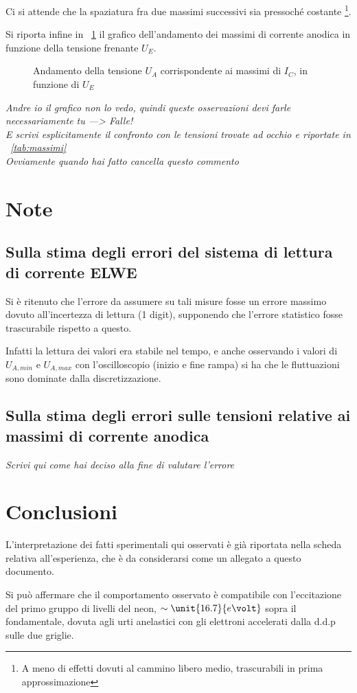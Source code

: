 \documentclass[10pt,a4paper]{article}
\begin{document}
Ci si attende che la spaziatura fra due massimi successivi sia pressoché costante \footnote{A meno di effetti dovuti al cammino libero medio, trascurabili in prima approssimazione}.


Si riporta infine in \figurename{~\ref{fig:final}} il grafico dell'andamento dei massimi di corrente anodica in funzione della tensione frenante $U_E$.

\begin{figure}[h!]
	\centering
	\caption{Andamento della tensione $U_A$ corrispondente ai massimi di $I_C$, in funzione di $U_E$}
	\label{fig:final}
\end{figure}

\emph{\LARGE Andre io il grafico non lo vedo, quindi queste osservazioni devi farle necessariamente tu ---> Falle! \\	
E scrivi esplicitamente il confronto con le tensioni trovate ad occhio e riportate in \tablename{~\ref{tab:massimi}} \\
Ovviamente quando hai fatto cancella questo commento}

\section{Note}

\subsection{Sulla stima degli errori del sistema di lettura di corrente ELWE}
\label{errELWE}
Si è ritenuto che l'errore da assumere su tali misure fosse un errore massimo dovuto all'incertezza di lettura (1 digit), supponendo che l'errore statistico fosse trascurabile rispetto a questo.

Infatti la lettura dei valori era stabile nel tempo, e anche osservando i valori di $U_{A, min}$ e $U_{A, max}$ con l'oscilloscopio (inizio e fine rampa) si ha che le fluttuazioni sono dominate dalla discretizzazione.

\subsection{Sulla stima degli errori sulle tensioni relative ai massimi di corrente anodica}

\emph{\LARGE Scrivi qui come hai deciso alla fine di valutare l'errore}


\section{Conclusioni}
L'interpretazione dei fatti sperimentali qui osservati è già riportata nella scheda relativa all'esperienza, che è da considerarsi come un allegato a questo documento.

Si può affermare che il comportamento osservato è compatibile con l'eccitazione del primo gruppo di livelli del neon, $\sim \unit{16.7}{e\volt}$ sopra il fondamentale, dovuta agli urti anelastici con gli elettroni accelerati dalla d.d.p sulle due griglie.
\end{document}
